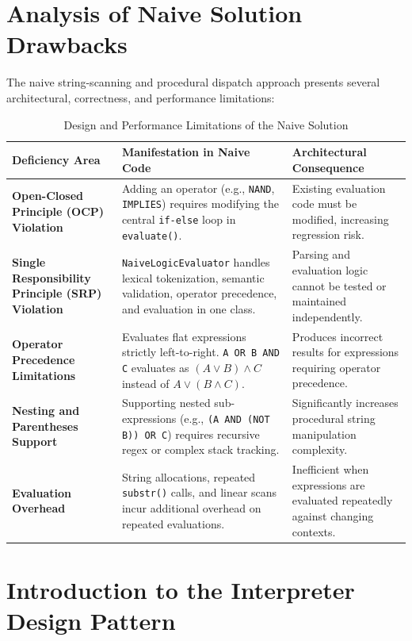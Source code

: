 \documentclass[12pt,a4paper]{article}
\begin{document}
\newpage
\section{Analysis of Naive Solution Drawbacks}

The naive string-scanning and procedural dispatch approach presents several architectural, correctness, and performance limitations:

\begin{table}[h]
\centering
\small
\begin{tabular}{p{3.8cm} p{5.5cm} p{5.5cm}}
\toprule
\textbf{Deficiency Area} & \textbf{Manifestation in Naive Code} & \textbf{Architectural Consequence} \\
\midrule
\textbf{Open-Closed Principle (OCP) Violation} & Adding an operator (e.g., \texttt{NAND}, \texttt{IMPLIES}) requires modifying the central \texttt{if-else} loop in \texttt{evaluate()}. & Existing evaluation code must be modified, increasing regression risk. \\
\addlinespace
\textbf{Single Responsibility Principle (SRP) Violation} & \texttt{NaiveLogicEvaluator} handles lexical tokenization, semantic validation, operator precedence, and evaluation in one class. & Parsing and evaluation logic cannot be tested or maintained independently. \\
\addlinespace
\textbf{Operator Precedence Limitations} & Evaluates flat expressions strictly left-to-right. \texttt{A OR B AND C} evaluates as $(A \lor B) \land C$ instead of $A \lor (B \land C)$. & Produces incorrect results for expressions requiring operator precedence. \\
\addlinespace
\textbf{Nesting and Parentheses Support} & Supporting nested sub-expressions (e.g., \texttt{(A AND (NOT B)) OR C}) requires recursive regex or complex stack tracking. & Significantly increases procedural string manipulation complexity. \\
\addlinespace
\textbf{Evaluation Overhead} & String allocations, repeated \texttt{substr()} calls, and linear scans incur additional overhead on repeated evaluations. & Inefficient when expressions are evaluated repeatedly against changing contexts. \\
\bottomrule
\end{tabular}
\caption{Design and Performance Limitations of the Naive Solution}
\end{table}

\section{Introduction to the Interpreter Design Pattern}
\end{document}

